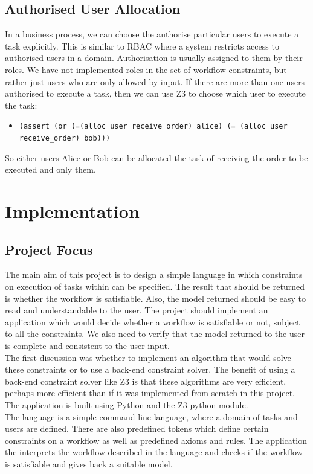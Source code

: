 \documentclass[a4paper]{report}
\begin{document}
\section{Authorised User Allocation}
In a business process, we can choose the authorise particular users to execute a task explicitly. This is similar to RBAC\cite{rbac} where a system restricts access to authorised users in a domain. Authorisation is usually assigned to them by their roles. We have not implemented roles in the set of workflow constraints, but rather just users who are only allowed by input. If there are more than one users authorised to execute a task, then we can use Z3 to choose which user to execute the task:
\begin{itemize}
\item \texttt{(assert (or (=(alloc\_user receive\_order) alice) (= (alloc\_user receive\_order) bob)))
}
\end{itemize}
So either users Alice or Bob can be allocated the task of receiving the order to be executed and only them.

\chapter{Implementation}
\section{Project Focus}
The main aim of this project is to design a simple language in which constraints on execution of tasks within can be specified. The result that should be returned is whether the workflow is satisfiable. Also, the model returned should be easy to read and understandable to the user. The project should implement an application which would decide whether a workflow is satisfiable or not, subject to all the constraints. We also need to verify that the model returned to the user is complete and consistent to the user input.\\

The first discussion was whether to implement an algorithm that would solve these constraints or to use a back-end constraint solver. The benefit of using a back-end constraint solver like Z3 is that these algorithms are very efficient, perhaps more efficient than if it was implemented from scratch in this project. The application is built using Python\cite{python} and the Z3 python module\cite{Z3Python}. \\

The language is a simple command line language, where a domain of tasks and users are defined. There are also predefined tokens which define certain constraints on a workflow as well as predefined axioms and rules. The application the interprets the workflow described in the language and checks if the workflow is satisfiable and gives back a suitable model.
\end{document}
